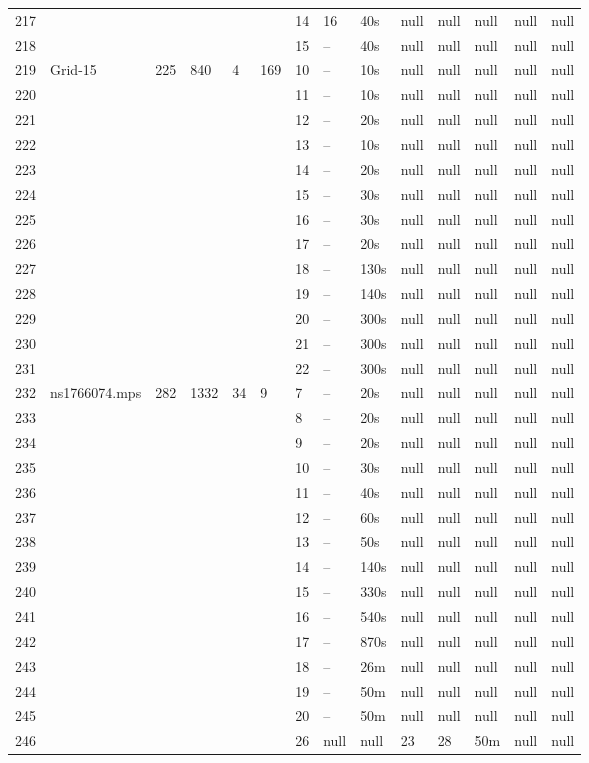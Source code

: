\documentclass{article}
\begin{document}
\begin{longtable}{|l |l |l |l |l |l |l |l |l |l |l |l |l |l |}
217&&&&&&14&16&40s&null&null&null&null&null\\
218&&&&&&15&--&40s&null&null&null&null&null\\
219&Grid-15&225&840&4&169&10&--&10s&null&null&null&null&null\\
220&&&&&&11&--&10s&null&null&null&null&null\\
221&&&&&&12&--&20s&null&null&null&null&null\\
222&&&&&&13&--&10s&null&null&null&null&null\\
223&&&&&&14&--&20s&null&null&null&null&null\\
224&&&&&&15&--&30s&null&null&null&null&null\\
225&&&&&&16&--&30s&null&null&null&null&null\\
226&&&&&&17&--&20s&null&null&null&null&null\\
227&&&&&&18&--&130s&null&null&null&null&null\\
228&&&&&&19&--&140s&null&null&null&null&null\\
229&&&&&&20&--&300s&null&null&null&null&null\\
230&&&&&&21&--&300s&null&null&null&null&null\\
231&&&&&&22&--&300s&null&null&null&null&null\\
232&ns1766074.mps&282&1332&34&9&7&--&20s&null&null&null&null&null\\
233&&&&&&8&--&20s&null&null&null&null&null\\
234&&&&&&9&--&20s&null&null&null&null&null\\
235&&&&&&10&--&30s&null&null&null&null&null\\
236&&&&&&11&--&40s&null&null&null&null&null\\
237&&&&&&12&--&60s&null&null&null&null&null\\
238&&&&&&13&--&50s&null&null&null&null&null\\
239&&&&&&14&--&140s&null&null&null&null&null\\
240&&&&&&15&--&330s&null&null&null&null&null\\
241&&&&&&16&--&540s&null&null&null&null&null\\
242&&&&&&17&--&870s&null&null&null&null&null\\
243&&&&&&18&--&26m&null&null&null&null&null\\
244&&&&&&19&--&50m&null&null&null&null&null\\
245&&&&&&20&--&50m&null&null&null&null&null\\
246&&&&&&26&null&null&23&28&50m&null&null\\
\hline
\end{longtable}
\end{document}
